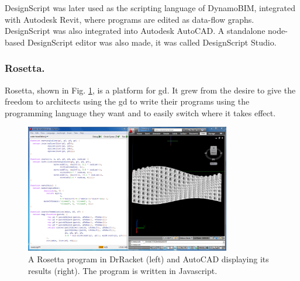 \documentclass{./llncs2e/llncs}
\begin{document}
	
	DesignScript was later used as the scripting language of DynamoBIM, integrated with Autodesk Revit, where programs are edited as data-flow graphs. 
	DesignScript was also integrated into Autodesk AutoCAD. 
	A standalone node-based DesignScript editor was also made, it was called DesignScript Studio.
	

\subsubsection{Rosetta.}
	Rosetta\cite{de2012modern,lopes2011portable}, shown in Fig. \ref{fig:rosetta:ex}, is a platform for \ac{gd}.
	It grew from the desire to give the freedom to architects using the \ac{gd} to write their programs using the programming language they want and to easily switch where it takes effect.
	
	\begin{figure}
		\centering
		\includegraphics[width=0.8\textwidth]{img/rosetta_js_autocad}
		\caption{A Rosetta program in DrRacket (left) and AutoCAD displaying its results (right). The program is written in Javascript.}
		\label{fig:rosetta:ex}
	\end{figure} 
	
\end{document}
